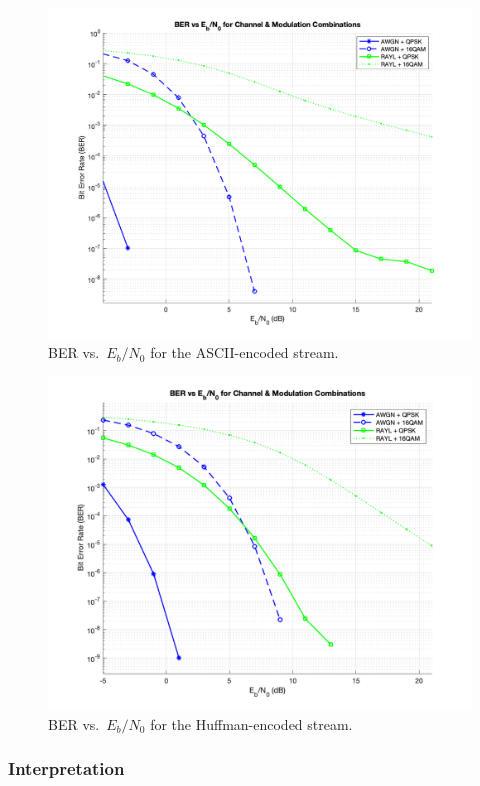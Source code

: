 \begin{figure}[h]
   \centering
   \includegraphics[width=0.8\linewidth]{Images/ascii_encode.png}
   \caption{BER vs.\ $E_b/N_0$ for the ASCII-encoded stream.}
   \label{fig:ascii_BER}
\end{figure}

\begin{figure}[h]
   \centering
   \includegraphics[width=0.8\linewidth]{Images/huffman_encode.png}
   \caption{BER vs.\ $E_b/N_0$ for the Huffman-encoded stream.}
   \label{fig:huffman_BER}
\end{figure}

\subsubsection*{Interpretation}

